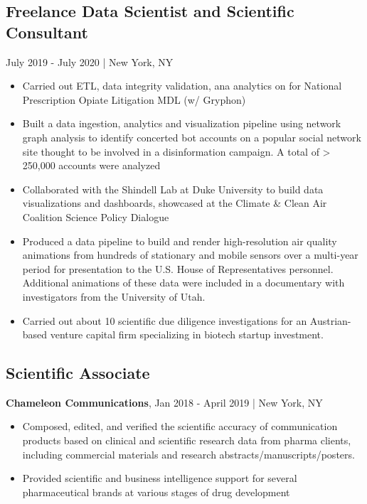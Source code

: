 \documentclass[11pt]{article}
\newenvironment{myitemize}
{ \begin{itemize}
	\setlength{\itemsep}{0pt}
	\setlength{\parskip}{0pt}
	\setlength{\parsep}{0pt}     }
{ \end{itemize}                  }
\begin{document}
\subsection*{Freelance Data Scientist and Scientific Consultant} July 2019 - July 2020 | New York, NY
\begin{myitemize}
	\item Carried out ETL, data integrity validation, ana analytics on for National Prescription Opiate Litigation MDL (w/ Gryphon)
	\item Built a data ingestion, analytics and visualization pipeline using network graph analysis to identify concerted bot accounts on a popular social network site thought to be involved in a disinformation campaign. A total of > 250,000 accounts were analyzed
	\item Collaborated with the Shindell Lab at Duke University to build data visualizations and dashboards, showcased at the Climate \& Clean Air Coalition Science Policy Dialogue
	\item Produced a data pipeline to build and render high-resolution air quality animations from hundreds of stationary and mobile sensors over a multi-year period for presentation to the U.S. House of Representatives personnel. Additional animations of these data were included in a documentary with investigators from the University of Utah.
	\item Carried out about 10 scientific due diligence investigations for an Austrian-based venture capital firm specializing in biotech startup investment.
\end{myitemize}

\subsection*{Scientific Associate}
{\bfseries Chameleon Communications}, Jan 2018 - April 2019 | New York, NY
\begin{myitemize}
	\item Composed, edited, and verified the scientific accuracy of communication products based on clinical and scientific research data from pharma clients, including commercial
	materials and research abstracts/manuscripts/posters.
	\item Provided scientific and business intelligence support for several pharmaceutical brands at various stages of drug development
\end{myitemize}
\end{document}
